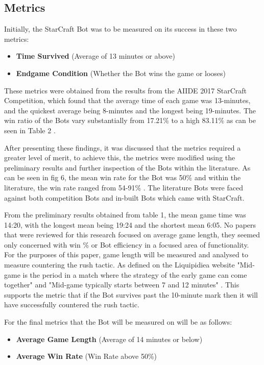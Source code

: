 \documentclass[journal]{IEEEtran}
\begin{document}
	\subsection{Metrics}
	
	Initially, the StarCraft Bot was to be measured on its success in these two metrics:
	\begin{itemize}
		\item \textbf{Time Survived} (Average of 13 minutes or above)
		\item \textbf{Endgame Condition} (Whether the Bot wins the game or looses)
	\end{itemize}
	These metrics were obtained from the results from the AIIDE 2017 StarCraft Competition, which found that the average time of each game was 13-minutes, and the quickest average being 8-minutes and the longest being 19-minutes. The win ratio of the Bots vary substantially from 17.21\% to a high 83.11\% as can be seen in Table 2 \cite{Results}. 
	
	After presenting these findings, it was discussed that the metrics required a greater level of merit, to achieve this, the metrics were modified using the preliminary results and further inspection of the Bots within the literature. As can be seen in fig 6, the mean win rate for the Bot was 50\% and within the literature, the win rate ranged from 54-91\% \cite{ELGoal,Swen,OnlineEvo,GoalDriven}. The literature Bots were faced against both competition Bots and in-built Bots which came with StarCraft.
	
	From the preliminary results obtained from table 1, the mean game time was 14:20, with the longest mean being 19:24 and the shortest mean 6:05. No papers that were reviewed for this research focused on average game length, they seemed only concerned with win \% or Bot efficiency in a focused area of functionality. For the purposes of this paper, game length will be measured and analysed to measure countering the rush tactic. As defined on the Liquipidiea website "Mid-game is the period in a match where the strategy of the early game can come together" and "Mid-game typically starts between 7 and 12 minutes" \cite{Liqui}. This supports the metric that if the Bot survives past the 10-minute mark then it will have successfully countered the rush tactic. 
	\newline
	
	For the final metrics that the Bot will be measured on will be as follows:
	\begin{itemize}
		\item \textbf{Average Game Length} (Average of 14 minutes or below)
		\item \textbf{Average Win Rate} (Win Rate above 50\%)
	\end{itemize}
	
\end{document}
